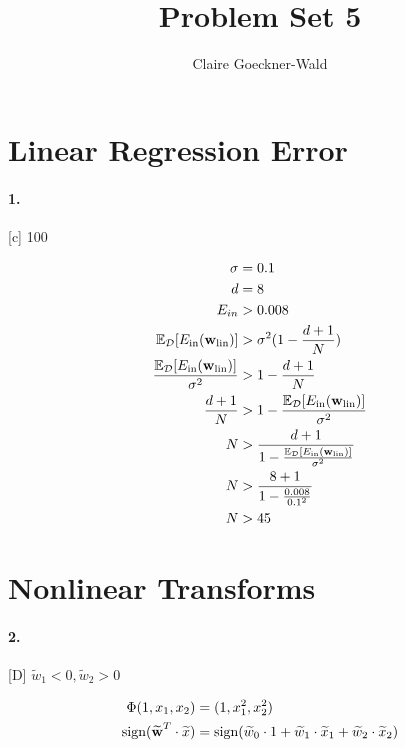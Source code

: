 \documentclass[10pt,letter]{article}
\newcommand{\sign}{\text{sign}}
\begin{document}
\title{Problem Set 5}
\author{Claire Goeckner-Wald}
\maketitle 

\section*{Linear Regression Error} 

\paragraph{1.} [c] 100

	\begin{align*}
	\sigma &= 0.1 \\
	d &= 8 \\
	E_{in} &> 0.008 \\
	\mathbb E_{\mathcal D}[E_{\text {in}}(\textbf w_{\text {lin}})] &> \sigma^2 (1 - \frac{d+1}{N}) \\
	\frac{\mathbb E_{\mathcal D}[E_{\text {in}}(\textbf w_{\text {lin}})]}{\sigma^2} &> 1 - \frac{d+1}{N} \\
	\frac{d+1}{N} &> 1 - \frac{\mathbb E_{\mathcal D}[E_{\text {in}}(\textbf w_{\text {lin}})]}{\sigma^2} \\
	N &> \frac{d+1}{1 - \frac{\mathbb E_{\mathcal D}[E_{\text {in}}(\textbf w_{\text {lin}})]}{\sigma^2}} \\
	N &> \frac{8+1}{1 - \frac{0.008}{0.1^2}} \\
	N &> 45
	\end{align*}

\section*{Nonlinear Transforms}

\paragraph{2.} [D] $\widetilde {w }_1 < 0, \widetilde {w }_2 > 0$

	\begin{align*}
	\Phi(1, x_1, x_2) &= (1, x_1^2, x_2^2) \\
	\sign(\widetilde {\textbf w }^T \cdot \widetilde x) &=  \sign(\widetilde {w }_0 \cdot 1 + \widetilde { w }_1 \cdot \widetilde x_1 + \widetilde { w }_2 \cdot \widetilde x_2)\\
	\end{align*}
\end{document}
